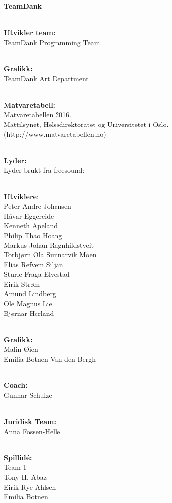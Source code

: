 \documentclass[paper=a4]{article}
\begin{document}
\begin{center} 
\textbf{TeamDank}\\ \

\textbf{Utvikler team:}\\
TeamDank Programming Team\\ \

\textbf{Grafikk:} \\
TeamDank Art Department \\ \

\textbf{Matvaretabell:} \\ 
Matvaretabellen 2016. \\
Mattilsynet, Helsedirektoratet og Universitetet i Oslo. (http://www.matvaretabellen.no) \\ \

\textbf{Lyder:} \\ 
Lyder brukt fra freesound: \\ \

\textbf{Utviklere}: \\
Peter Andre Johansen \\
Håvar Eggereide \\
Kenneth Apeland \\
Philip Thao Hoang \\
Markus Johan Ragnhildstveit \\
Torbjørn Ola Sunnarvik Moen \\
Elias Refvem Siljan \\
Sturle Fraga Elvestad \\
Eirik Strøm \\
Amund Lindberg \\
Ole Magnus Lie \\
Bjørnar Herland \\ \

\textbf{Grafikk:} \\
Malin Øien \\
Emilia Botnen Van den Bergh \\ \

\textbf{Coach:} \\
Gunnar Schulze \\ \ 

\textbf{Juridisk Team:} \\ 
Anna Fossen-Helle \\ \

\textbf{Spillidé:} \\
Team 1 \\
Tony H. Abaz \\
Eirik Rye Ahlsen \\
Emilia Botnen \\ \

\end{center}
\end{document}
